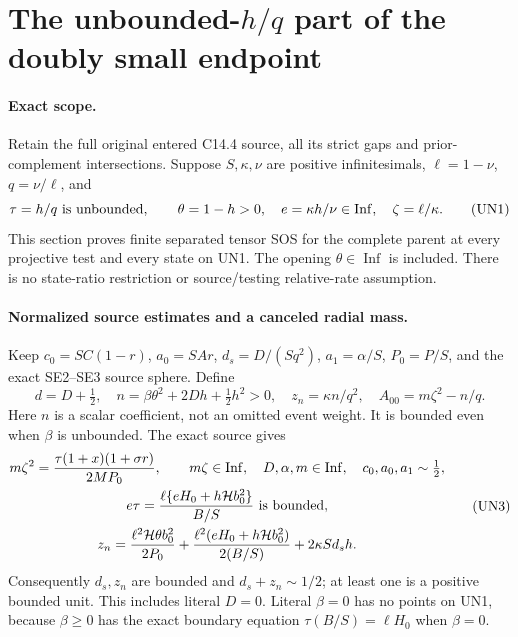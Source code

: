 \section{The unbounded-$h/q$ part of the doubly small endpoint}
\label{sec:new-c144-unbounded-h-ratio}

\paragraph{Exact scope.}
Retain the full original entered C14.4 source, all its strict gaps and
prior-complement intersections. Suppose $S,\kappa,\nu$ are positive
infinitesimals, $\ell=1-\nu$, $q=\nu/\ell$, and
\[
 \tau=h/q\ \hbox{is unbounded},\qquad
 \theta=1-h>0,\quad e=\kappa h/\nu\in\operatorname{Inf},\quad
 \zeta=\ell/\kappa.
 \tag{UN1}
\]
This section proves finite separated tensor SOS for the complete
parent at every projective test and every state on UN1. The opening
$\theta\in\operatorname{Inf}$ is included. There is no state-ratio
restriction or source/testing relative-rate assumption.

\paragraph{Normalized source estimates and a canceled radial mass.}
Keep $c_0=SC(1-r)$, $a_0=SAr$, $d_s=D/(Sq^2)$,
$a_1=\alpha/S$, $P_0=P/S$, and the exact SE2--SE3 source sphere.
Define
\[
 d=D+\tfrac12,\quad
 n=\beta\theta^2+2Dh+\tfrac12h^2>0,\quad
 z_n=\kappa n/q^2,\quad A_{00}=m\zeta^2-n/q.
 \tag{UN2}
\]
Here $n$ is a scalar coefficient, not an omitted event weight.
It is bounded even when $\beta$ is unbounded. The exact source gives
\[
\begin{gathered}
 m\zeta^2=\frac{\tau(1+x)(1+\sigma r)}{2MP_0},\qquad
 m\zeta\in\operatorname{Inf},\quad D,\alpha,m\in\operatorname{Inf},\quad
 c_0,a_0,a_1\sim\tfrac12,\\
 e\tau=\frac{\ell\{eH_0+h\mathcal H b_0^2\}}{B/S}\ \hbox{is bounded},\\
 z_n=\frac{\ell^2\mathcal H\theta b_0^2}{2P_0}
 +\frac{\ell^2(eH_0+h\mathcal H b_0^2)}{2(B/S)}
 +2\kappa S d_s h.
\end{gathered}\tag{UN3}
\]
Consequently $d_s,z_n$ are bounded and
$d_s+z_n\sim1/2$; at least one is a positive bounded unit. This
includes literal $D=0$. Literal $\beta=0$ has no points on UN1,
because $\beta\ge0$ has the exact boundary equation
$\tau(B/S)=\ell H_0$ when $\beta=0$.

